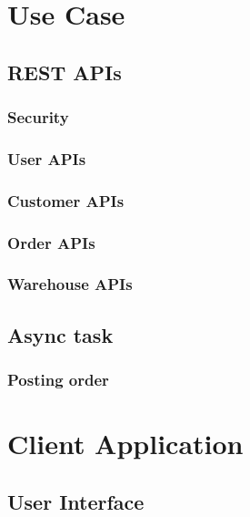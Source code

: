 \section{Use Case}
\subsection{REST APIs}
\subsubsection{Security}
\subsubsection{User APIs}
\subsubsection{Customer APIs}
\subsubsection{Order APIs}
\subsubsection{Warehouse APIs}
\subsection{Async task}
\subsubsection{Posting order}

\section{Client Application}
\subsection{User Interface}

